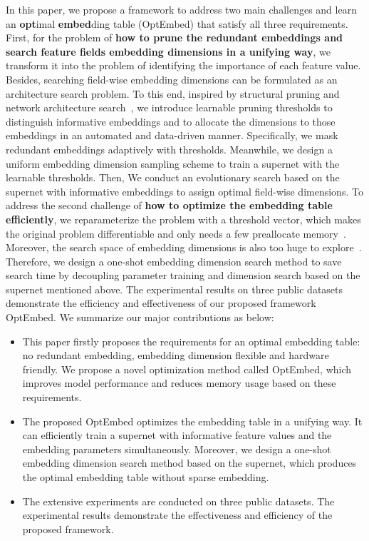 \documentclass[sigconf]{acmart}
\begin{document}
In this paper, we propose a framework to address two main challenges and learn an \textbf{opt}imal \textbf{embed}ding table (OptEmbed) that satisfy all three requirements. First, for the problem of \textbf{how to prune the redundant embeddings and search feature fields embedding dimensions in a unifying way}, we transform it into the problem of identifying the importance of each feature value. Besides, searching field-wise embedding dimensions can be formulated as an architecture search problem. To this end, inspired by structural pruning and network architecture search~\cite{LTH,proxylessnas}, we introduce learnable pruning thresholds to distinguish informative embeddings and to allocate the dimensions to those embeddings in an automated and data-driven manner. Specifically, we mask redundant embeddings adaptively with thresholds. Meanwhile, we design a uniform embedding dimension sampling scheme to train a supernet with the learnable thresholds. Then, We conduct an evolutionary search based on the supernet with informative embeddings to assign optimal field-wise dimensions. To address the second challenge of \textbf{how to optimize the embedding table efficiently}, we reparameterize the problem with a threshold vector, which makes the original problem differentiable and only needs a few preallocate memory~\cite{featureselection}. Moreover, the search space of embedding dimensions is also too huge to explore~\cite{AutoDim}. Therefore, we design a one-shot embedding dimension search method to save search time by decoupling parameter training and dimension search based on the supernet mentioned above. The experimental results on three public datasets demonstrate the efficiency and effectiveness of our proposed framework OptEmbed. We summarize our major contributions as below:
\begin{itemize}[topsep=0pt,noitemsep,nolistsep,leftmargin=*]
    \item This paper firstly proposes the requirements for an optimal embedding table: no redundant embedding, embedding dimension flexible and hardware friendly. We propose a novel optimization method called OptEmbed, which improves model performance and reduces memory usage based on these requirements.
    \item The proposed OptEmbed optimizes the embedding table in a unifying way. It can efficiently train a supernet with informative feature values and the embedding parameters simultaneously. Moreover, we design a one-shot embedding dimension search method based on the supernet, which produces the optimal embedding table without sparse embedding.
    \item The extensive experiments are conducted on three public datasets. The experimental results demonstrate the effectiveness and efficiency of the proposed framework.
\end{itemize} 
\end{document}
